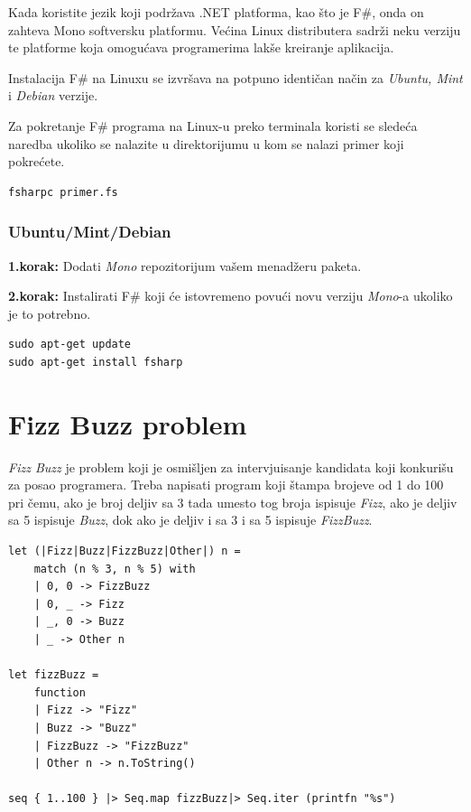 \documentclass[a4paper]{article}
\begin{document}
Kada koristite jezik koji podržava .NET platforma, kao što je F\#, onda on zahteva Mono \cite{mono} softversku platformu. Većina Linux distributera sadrži neku verziju te platforme koja omogućava programerima lakše kreiranje aplikacija. 

Instalacija F\# na Linuxu se izvršava na potpuno identičan način za {\em Ubuntu, Mint} i {\em Debian} verzije.

Za pokretanje F\# programa na Linux-u preko terminala koristi se sledeća naredba ukoliko se nalazite u direktorijumu u kom se nalazi primer koji pokrećete.
\\
\begin{lstlisting}
fsharpc primer.fs
\end{lstlisting}

\subsubsection{Ubuntu/Mint/Debian}

\textbf{1.korak:} Dodati {\em Mono} \cite{mono} repozitorijum vašem menadžeru paketa.

\textbf{2.korak:} Instalirati F\# koji će istovremeno povući novu verziju {\em Mono}-a ukoliko je to potrebno.
\\
\begin{lstlisting}
sudo apt-get update
sudo apt-get install fsharp
\end{lstlisting}
 
\section{Fizz Buzz problem}
\textit{Fizz Buzz} je problem koji je osmišljen za intervjuisanje kandidata koji konkurišu za posao programera. Treba napisati program koji štampa brojeve od 1 do 100 pri čemu, ako je broj deljiv sa 3 tada umesto tog broja ispisuje \textit{Fizz}, ako je deljiv sa 5 ispisuje \textit{Buzz}, dok ako je deljiv i sa 3 i sa 5 ispisuje \textit{FizzBuzz}. \\

\begin{lstlisting}[caption={Fizz Buzz \cite{fizzBuzz}},frame=single, label=fizzbuzz]
let (|Fizz|Buzz|FizzBuzz|Other|) n =
    match (n % 3, n % 5) with
    | 0, 0 -> FizzBuzz
    | 0, _ -> Fizz
    | _, 0 -> Buzz
    | _ -> Other n

let fizzBuzz =
    function
    | Fizz -> "Fizz"
    | Buzz -> "Buzz"
    | FizzBuzz -> "FizzBuzz"
    | Other n -> n.ToString()

seq { 1..100 } |> Seq.map fizzBuzz|> Seq.iter (printfn "%s")
\end{lstlisting}
\end{document}
